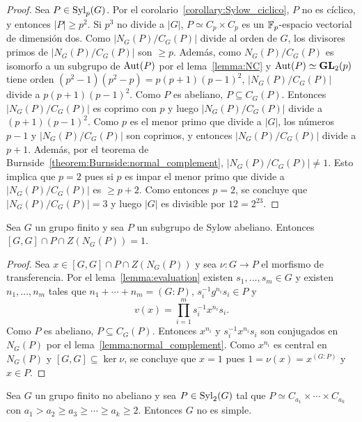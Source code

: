 \begin{proof}
	Sea $P\in\mathrm{Syl}_p(G)$. Por el corolario~\ref{corollary:Sylow_ciclico}, $P$ no
	es cíclico, y entonces $|P|\geq p^2$. Si $p^3$ no divide a $|G|$, $P\simeq
	C_p\times C_p$ es un $\mathbb{F}_p$-espacio vectorial de dimensión dos. Como
	$|N_G(P)/C_G(P)|$ divide al orden de $G$, los divisores primos de
	$|N_G(P)/C_G(P)|$ son $\geq p$. Además, como $N_G(P)/C_G(P)$ es isomorfo a
	un subgrupo de $\operatorname{Aut}(P)$ por el lema~\ref{lemma:NC} y
	$\operatorname{Aut}(P)\simeq\mathbf{GL}_2(p)$ tiene orden $(p^2-1)(p^2-p)=p(p+1)(p-1)^2$,
	$|N_G(P)/C_G(P)|$ divide a $p(p+1)(p-1)^2$.  Como $P$ es abeliano,
	$P\subseteq C_G(P)$. Entonces $|N_G(P)/C_G(P)|$ es coprimo con $p$ y luego
	$|N_G(P)/C_G(P)|$ divide a $(p+1)(p-1)^2$. Como $p$ es el menor primo que
	divide a $|G|$, los números $p-1$ y $|N_G(P)/C_G(P)|$ son coprimos, y
	entonces $|N_G(P)/C_G(P)|$ divide a $p+1$.  Además, por el teorema de
	Burnside~\ref{theorem:Burnside:normal_complement}, $|N_G(P)/C_G(P)|\ne1$.
	Esto implica que $p=2$ pues si $p$ es impar el menor primo que divide a
	$|N_G(P)/C_G(P)|$ es $\geq p+2$.  Como entonces $p=2$, se concluye que
	$|N_G(P)/C_G(P)|=3$ y luego $|G|$ es divisible por $12=2^23$. 
\end{proof}

\begin{theorem}
	\label{theorem:[GG]PZNG(P)=1}
	Sea $G$ un grupo finito y sea $P$ un subgrupo de Sylow abeliano. Entonces 
	$[G,G]\cap P\cap Z(N_G(P))=1$.
\end{theorem}

\begin{proof}
	Sea $x\in [G,G]\cap P\cap Z(N_G(P))$ y sea $\nu\colon G\to P$ el morfismo
	de transferencia.  Por el lema~\ref{lemma:evaluation} existen
	$s_1,\dots,s_m\in G$ y existen $n_1,\dots,n_m$ tales que
	$n_1+\cdots+n_m=(G:P)$, $s_i^{-1}g^{n_i}s_i\in P$ y 
	\[
		v(x)=\prod_{i=1}^m s_i^{-1}x^{n_i}s_i.
	\]
	Como $P$ es abeliano, $P\subseteq C_G(P)$. Entonces $x^{n_i}$ y
	$s_i^{-1}x^{n_i}s_i$ son conjugados en $N_G(P)$ por el
	lema~\ref{lemma:normal_complement}. Como $x^{n_i}$ es central en $N_G(P)$ y
	$[G,G]\subseteq\ker\nu$, se concluye que $x=1$ pues $1=\nu(x)=x^{(G:P)}$ y
	$x\in P$.
\end{proof}

\begin{corollary}
	Sea $G$ un grupo finito no abeliano y sea $P\in\mathrm{Syl}_2(G)$ tal que $P\simeq
	C_{a_1}\times\cdots\times C_{a_k}$ con $a_1>a_2\geq a_3\geq\cdots\geq
	a_k\geq 2$.  Entonces $G$ no es simple. 
\end{corollary}

